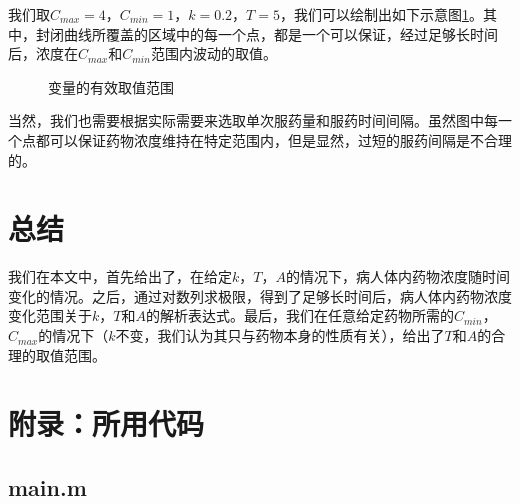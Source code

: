 \documentclass[12pt,AutoFakeSlant,AutoFakeBold]{article}
\begin{document}
我们取$C_{max} = 4$，$C_{min} = 1$，$k = 0.2$，$T = 5$，我们可以绘制出如下示意图\ref{fig:有效取值范围}。其中，封闭曲线所覆盖的区域中的每一个点，都是一个可以保证，经过足够长时间后，浓度在$C_{max}$和$C_{min}$范围内波动的取值。

\begin{figure}[!ht]
    \centering
    \caption{变量的有效取值范围}
    \label{fig:有效取值范围}
\end{figure}

当然，我们也需要根据实际需要来选取单次服药量和服药时间间隔。虽然图中每一个点都可以保证药物浓度维持在特定范围内，但是显然，过短的服药间隔是不合理的。

\section{总结}

我们在本文中，首先给出了，在给定$k$，$T$，$A$的情况下，病人体内药物浓度随时间变化的情况。之后，通过对数列求极限，得到了足够长时间后，病人体内药物浓度变化范围关于$k$，$T$和$A$的解析表达式。最后，我们在任意给定药物所需的$C_{min}$，$C_{max}$的情况下（$k$不变，我们认为其只与药物本身的性质有关），给出了$T$和$A$的合理的取值范围。

\appendix

\section{附录：所用代码}

\subsection*{main.m}
\end{document}
